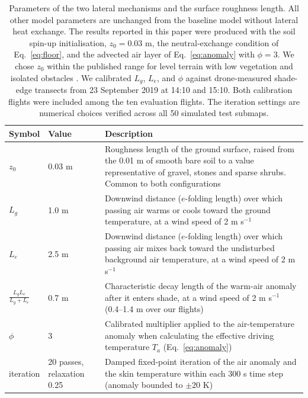 \documentclass[12pt]{article}
\renewcommand{\baselinestretch}{2}
\begin{document}
\newpage

\begin{table}[ht]
\centering
\begingroup\small\renewcommand{\baselinestretch}{1.0}\selectfont
\renewcommand{\arraystretch}{1.15}
\begin{tabular}{ |p{2.6cm}||p{2.4cm}|p{9.5cm}| }
 \hline
 Symbol & Value & Description \\
 \hline
 $z_0$ & 0.03 m & Roughness length of the ground surface, raised from the 0.01 m of smooth bare soil to a value representative of gravel, stones and sparse shrubs. Common to both configurations \\
 \hline
 $L_g$ & 1.0 m & Downwind distance ($e$-folding length) over which passing air warms or cools toward the ground temperature, at a wind speed of 2 m s$^{-1}$ \\
 \hline
 $L_e$ & 2.5 m & Downwind distance ($e$-folding length) over which passing air mixes back toward the undisturbed background air temperature, at a wind speed of 2 m s$^{-1}$ \\
 \hline
 $\frac{L_g L_e}{L_g + L_e}$ & 0.7 m & Characteristic decay length of the warm-air anomaly after it enters shade, at a wind speed of 2 m s$^{-1}$ (0.4--1.4 m over our flights) \\
 \hline
 $\phi$ & 3 & Calibrated multiplier applied to the air-temperature anomaly when calculating the effective driving temperature $T_a$ (Eq.~\ref{eq:anomaly}) \\
 \hline
 iteration & 20 passes, relaxation 0.25 & Damped fixed-point iteration of the air anomaly and the skin temperature within each 300 s time step (anomaly bounded to $\pm 20$ K) \\
 \hline
 \end{tabular}
\endgroup
\caption{Parameters of the two lateral mechanisms and the surface roughness length. All other model parameters are unchanged from the baseline model without lateral heat exchange. The results reported in this paper were produced with the soil spin-up initialisation, $z_0 = 0.03$ m, the neutral-exchange condition of Eq.~\ref{eq:floor}, and the advected air layer of Eq.~\ref{eq:anomaly} with $\phi = 3$. We chose $z_0$ within the published range for level terrain with low vegetation and isolated obstacles \citep{oke_1987}. We calibrated $L_g$, $L_e$, and $\phi$ against drone-measured shade-edge transects from 23 September 2019 at 14:10 and 15:10. Both calibration flights were included among the ten evaluation flights. The iteration settings are numerical choices verified across all 50 simulated test submaps.}
\label{table:lateralparam}
\end{table}
\end{document}
